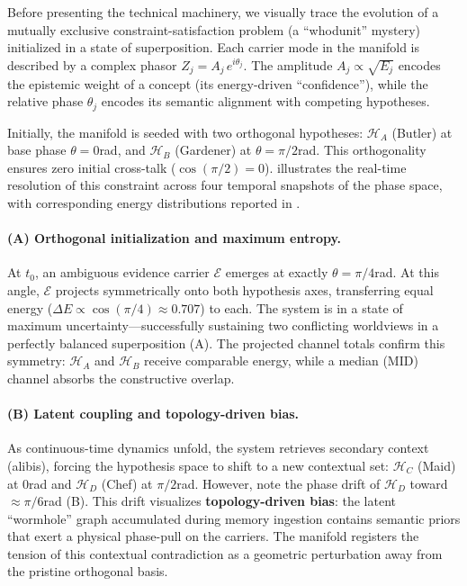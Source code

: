 \documentclass[11pt,a4paper]{article}
\begin{document}
Before presenting the technical machinery, we visually trace the evolution of a mutually exclusive constraint-satisfaction problem (a ``whodunit'' mystery) initialized in a state of superposition. Each carrier mode in the manifold is described by a complex phasor $Z_j = A_j \, e^{i\theta_j}$. The amplitude $A_j \propto \sqrt{E_j}$ encodes the epistemic weight of a concept (its energy-driven ``confidence''), while the relative phase $\theta_j$ encodes its semantic alignment with competing hypotheses. 

Initially, the manifold is seeded with two orthogonal hypotheses: $\mathcal{H}_A$ (Butler) at base phase $\theta = 0$\;rad, and $\mathcal{H}_B$ (Gardener) at $\theta = \pi/2$\;rad. This orthogonality ensures zero initial cross-talk ($\cos(\pi/2) = 0$).  illustrates the real-time resolution of this constraint across four temporal snapshots of the phase space, with corresponding energy distributions reported in .

\paragraph{(A) Orthogonal initialization and maximum entropy.}
At $t_0$, an ambiguous evidence carrier $\mathcal{E}$ emerges at exactly $\theta = \pi/4$\;rad. At this angle, $\mathcal{E}$ projects symmetrically onto both hypothesis axes, transferring equal energy ($\Delta E \propto \cos(\pi/4) \approx 0.707$) to each. The system is in a state of maximum uncertainty---successfully sustaining two conflicting worldviews in a perfectly balanced superposition (A). The projected channel totals confirm this symmetry: $\mathcal{H}_A$ and $\mathcal{H}_B$ receive comparable energy, while a median (MID) channel absorbs the constructive overlap.

\paragraph{(B) Latent coupling and topology-driven bias.}
As continuous-time dynamics unfold, the system retrieves secondary context (alibis), forcing the hypothesis space to shift to a new contextual set: $\mathcal{H}_C$ (Maid) at $0$\;rad and $\mathcal{H}_D$ (Chef) at $\pi/2$\;rad. However, note the phase drift of $\mathcal{H}_D$ toward $\approx\!\pi/6$\;rad (B). This drift visualizes \textbf{topology-driven bias}: the latent ``wormhole'' graph accumulated during memory ingestion contains semantic priors that exert a physical phase-pull on the carriers. The manifold registers the tension of this contextual contradiction as a geometric perturbation away from the pristine orthogonal basis.
\end{document}
